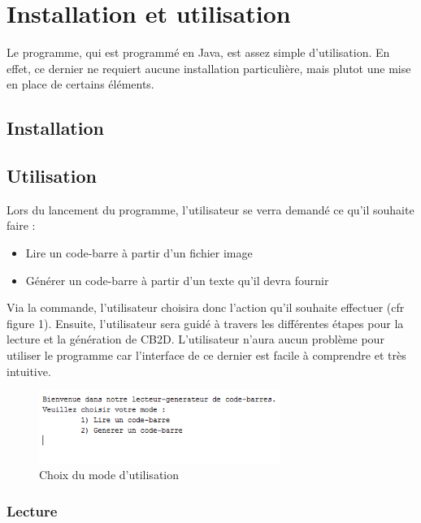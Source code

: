 \newpage
\section{Installation et utilisation}

Le programme, qui est programmé en Java, est assez simple d'utilisation. En effet, ce dernier ne requiert aucune installation particulière, mais plutot une mise en place de certains éléments. 

\subsection{Installation}

\subsection{Utilisation}

Lors du lancement du programme, l'utilisateur se verra demandé ce qu'il souhaite faire : 
\begin{itemize}
\item Lire un code-barre à partir d'un fichier image
\item Générer un code-barre à partir d'un texte qu'il devra fournir
\end{itemize}

Via la commande, l'utilisateur choisira donc l'action qu'il souhaite effectuer (cfr figure 1). Ensuite, l'utilisateur sera guidé à travers les différentes étapes pour la lecture et la génération de CB2D. L'utilisateur n'aura aucun problème pour utiliser le programme car l'interface de ce dernier est facile à comprendre et très intuitive. 

\begin{figure}[!h]
	\centering
	\includegraphics[width=0.7\textwidth]{images/choixMode.png}
	\caption{Choix du mode d'utilisation}  
	\label{Choix du mode d'utilisation}
\end{figure}



\subsubsection{Lecture}

